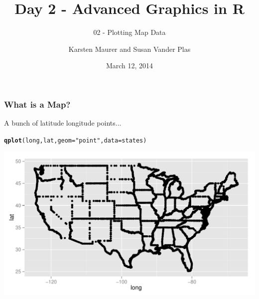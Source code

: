 \documentclass{beamer}\usepackage[]{graphicx}\usepackage[]{color}
\title[ 1-Intro]{Day 2 - Advanced Graphics in R}
\subtitle{02 - Plotting Map Data}
\author[ K. Maurer, S. Vander Plas]{Karsten Maurer and Susan Vander Plas}
\date{March 12, 2014}
\institute[ISU]{Iowa State University}
\makeatletter
\newcommand{\hlstr}[1]{\textcolor[rgb]{0.192,0.494,0.8}{#1}}%
\newcommand{\hlstd}[1]{\textcolor[rgb]{0.345,0.345,0.345}{#1}}%
\newcommand{\hlkwc}[1]{\textcolor[rgb]{0.333,0.667,0.333}{#1}}%
\newcommand{\hlkwd}[1]{\textcolor[rgb]{0.737,0.353,0.396}{\textbf{#1}}}%
\newenvironment{kframe}{%
 \def\at@end@of@kframe{}%
 \ifinner\ifhmode%
  \def\at@end@of@kframe{\end{minipage}}%
  \begin{minipage}{\columnwidth}%
 \fi\fi%
 \def\FrameCommand##1{\hskip\@totalleftmargin \hskip-\fboxsep
 \colorbox{shadecolor}{##1}\hskip-\fboxsep
     \hskip-\linewidth \hskip-\@totalleftmargin \hskip\columnwidth}%
 \MakeFramed {\advance\hsize-\width
   \@totalleftmargin\z@ \linewidth\hsize
   \@setminipage}}%
 {\par\unskip\endMakeFramed%
 \at@end@of@kframe}
\newenvironment{knitrout}{}{} %
\makeatother
\begin{document}
\begin{frame}
    \maketitle
\end{frame}



\begin{frame}[fragile]
    \frametitle{What is a Map?}

A bunch of latitude longitude points...

\small
\begin{knitrout}\footnotesize
{}\color{fgcolor}\begin{kframe}
\begin{alltt}
\hlkwd{qplot}\hlstd{(long, lat,} \hlkwc{geom} \hlstd{=} \hlstr{"point"}\hlstd{,} \hlkwc{data} \hlstd{= states)}
\end{alltt}
\end{kframe}
\includegraphics[width=\textwidth]{figure/kmappoints} 

\end{knitrout}

    \normalsize
\end{frame}

\end{document}
